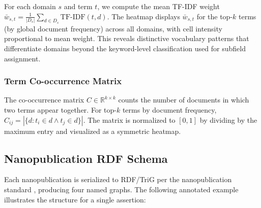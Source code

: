 \documentclass[
  english,
]{article}
\begin{document}
For each domain \(s\) and term \(t\), we compute the mean TF-IDF weight
\(\bar{w}_{s,t} = \frac{1}{|D_s|} \sum_{d \in D_s} \text{TF-IDF}(t, d)\).
The heatmap displays \(\bar{w}_{s,t}\) for the top-\(k\) terms (by
global document frequency) across all domains, with cell intensity
proportional to mean weight. This reveals distinctive vocabulary
patterns that differentiate domains beyond the keyword-level
classification used for subfield assignment.

\subsubsection{Term Co-occurrence
Matrix}\label{term-co-occurrence-matrix}

The co-occurrence matrix \(C \in \mathbb{R}^{k \times k}\) counts the
number of documents in which two terms appear together. For top-\(k\)
terms by document frequency,
\(C_{ij} = |\{d : t_i \in d \land t_j \in d\}|\). The matrix is
normalized to \([0, 1]\) by dividing by the maximum entry and visualized
as a symmetric heatmap.

\FloatBarrier

\subsection{Nanopublication RDF Schema}\label{sec:appendix_rdf}

Each nanopublication is serialized to RDF/TriG per the nanopublication
standard \citep{groth2010anatomy, kuhn2016decentralized}, producing four
named graphs. The following annotated example illustrates the structure
for a single assertion:
\end{document}
